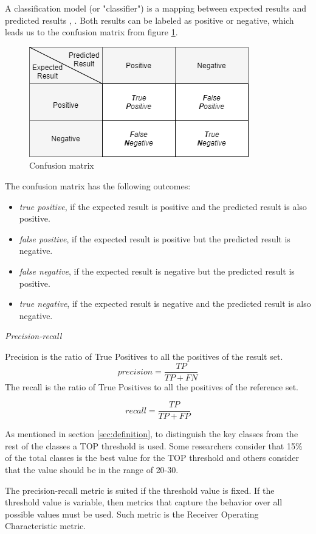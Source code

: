 \documentclass[12pt]{mitthesis}
\begin{document}
A classification model (or "classifier") is a mapping between expected results and predicted results \cite{ROCIntro}, \cite{ROCBRADLEY19971145}. Both results can be labeled as positive or negative, which leads us to the confusion matrix from figure \ref{fig:confusion}. 
\begin{figure}[h]
\centering
\includegraphics[scale=0.9]{confusion.png}
\caption{Confusion matrix}
\label{fig:confusion}
\centering
\end{figure}
The confusion matrix has the following outcomes:
		\begin{itemize}
			\item \textit{true positive}, if the expected result is positive and the predicted result is also positive.
			\item \textit{false positive}, if the expected result is positive but the predicted result is negative.
			\item \textit{false negative}, if the expected result is negative but the predicted result is positive.
			\item \textit{true negative}, if the expected result is negative and the predicted result is also negative.
		\end{itemize}


\textit{Precision-recall}


Precision is the ratio of True Positives to all the positives of the result set.
\[ precision
  = \dfrac{TP}{TP+FN}
\]
The recall is the ratio of True Positives to all the positives of the reference set.

\[ recall
  = \dfrac{TP}{TP+FP}
\]

As mentioned in section \ref{sec:definition}, to distinguish the key classes from the rest of the classes a TOP threshold is used. Some researchers consider that 15\% of the total classes is the best value for the TOP threshold and others consider that the value should be in the range of 20-30. 

The precision-recall metric is suited if the threshold value is fixed. If the threshold value is variable, then metrics that capture the behavior over all possible values must be used. Such metric is the Receiver Operating Characteristic metric.
\end{document}
